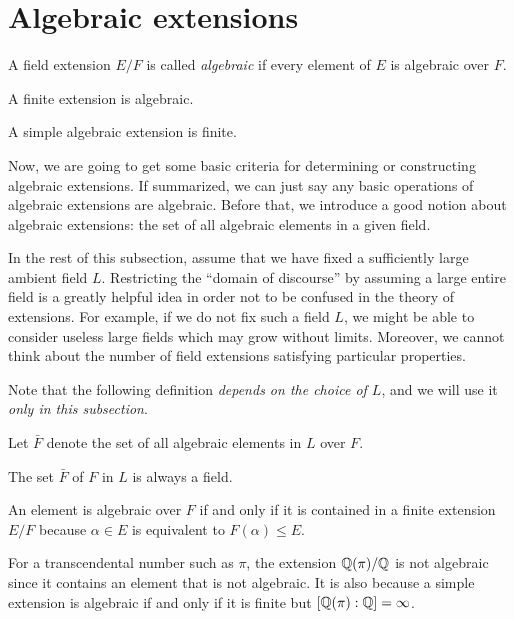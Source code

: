 \documentclass{../../large}
\begin{document}
\section{Algebraic extensions}

\begin{prb}
A field extension $E/F$ is called \emph{algebraic} if every element of $E$ is algebraic over $F$.
\begin{parts}
\item A finite extension is algebraic.
\item A simple algebraic extension is finite.
\end{parts}
\end{prb}

Now, we are going to get some basic criteria for determining or constructing algebraic extensions.
If summarized, we can just say any basic operations of algebraic extensions are algebraic.
Before that, we introduce a good notion about algebraic extensions: the set of all algebraic elements in a given field.

In the rest of this subsection, assume that we have fixed a sufficiently large ambient field $L$.
Restricting the ``domain of discourse'' by assuming a large entire field is a greatly helpful idea in order not to be confused in the theory of extensions.
For example, if we do not fix such a field $L$, we might be able to consider useless large fields which may grow without limits.
Moreover, we cannot think about the number of field extensions satisfying particular properties.

Note that the following definition \emph{depends on the choice of $L$}, and we will use it \emph{only in this subsection}.
\begin{defn}
Let $\bar F$ denote the set of all algebraic elements in $L$ over $F$.
\end{defn}
\begin{prop}
The set $\bar F$ of $F$ in $L$ is always a field.
\end{prop}
\begin{pf}
An element is algebraic over $F$ if and only if it is contained in a finite extension $E/F$ because $\alpha\in E$ is equivalent to $F(\alpha)\le E$.

\end{pf}



\begin{ex}
For a transcendental number such as $\pi$, the extension $\mathbb{Q}(\pi)/\mathbb{Q}$ is not algebraic since it contains an element that is not algebraic.
It is also because a simple extension is algebraic if and only if it is finite but $[\mathbb{Q}(\pi):\mathbb{Q}]=\infty$.
\end{ex}
\end{document}
